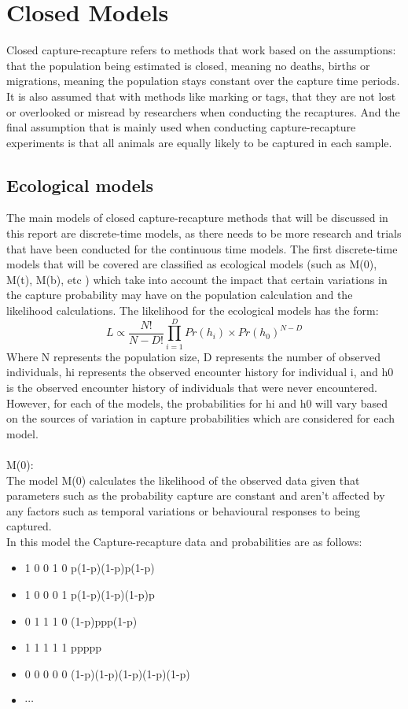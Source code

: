 \documentclass[,oneside]{article}
\numberwithin{equation}{section}
\begin{document}
\section{\large{Closed Models}}
Closed capture-recapture refers to methods that work based on the assumptions: that the population being estimated is closed, meaning no deaths, births or migrations, meaning the population stays constant over the capture time periods. It is also assumed that with methods like marking or tags, that they are not lost or overlooked or misread by researchers when conducting the recaptures.  And the final assumption that is mainly used when conducting capture-recapture experiments is that all animals are equally likely to be captured in each sample.
\subsection{Ecological models}
The main models of closed capture-recapture methods that will be discussed in this report are discrete-time models, as there needs to be more research and trials that have been conducted for the continuous time models. The first discrete-time models that will be covered are classified as ecological models (such as M(0), M(t), M(b), etc ) which take into account the impact that certain variations in the capture probability may have on the population calculation and the likelihood calculations.
The likelihood for the ecological models has the form: 
\begin{equation}
L\propto\frac{N!}{N-D!}\prod_{i=1}^{D}Pr(h_i)\times Pr(h_0)^{N-D}
\end{equation}
Where N represents the population size, D represents the number of observed individuals, hi represents the observed encounter history for individual i, and h0 is the observed encounter history of individuals that were never encountered. However, for each of the models, the probabilities for hi and h0 will vary based on the sources of variation in capture probabilities which are considered for each model. \\ \\
M(0): \\
The model M(0) calculates the likelihood of the observed data given that parameters such as the probability capture are constant and aren't affected by any factors such as temporal variations or behavioural responses to being captured. \\
In this model the Capture-recapture data and probabilities are as follows: 
\begin{itemize}
\item 1 0 0 1 0 \hspace{1cm}p(1-p)(1-p)p(1-p)
\item 1 0 0 0 1 \hspace{1cm}p(1-p)(1-p)(1-p)p
\item 0 1 1 1 0 \hspace{1cm}(1-p)ppp(1-p)
\item 1 1 1 1 1 \hspace{1cm}ppppp
\item 0 0 0 0 0 \hspace{1cm}(1-p)(1-p)(1-p)(1-p)(1-p)
\item $\cdots$
\end{itemize}
\end{document}
